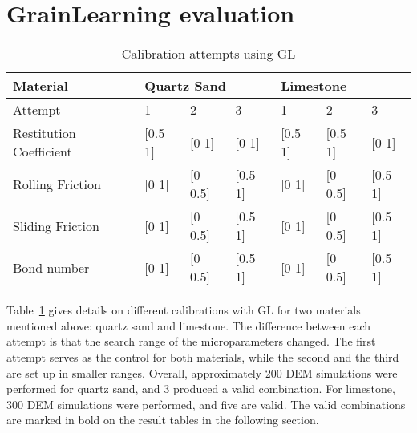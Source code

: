 \section{GrainLearning evaluation}\label{section:GLPerformance} 
\begin{table}[H]
    \centering
    \begin{tabular}{l|lll|lll}
    Material                & \multicolumn{3}{l|}{Quartz Sand}       & \multicolumn{3}{l}{Limestone}          \\ \hline
    Attempt                 & 1          & 2           & 3           & 1          & 2           & 3           \\ \hline
    Restitution Coefficient & {[}0.5  1{]} & {[}0  1{]}  & {[}0 1{]}   & {[}0.5  1{]} & {[}0.5  1{]}  & {[}0 1{]}   \\
    Rolling Friction        & {[}0 1{]}  & {[}0 0.5{]} & {[}0.5 1{]} & {[}0 1{]}  & {[}0 0.5{]} & {[}0.5 1{]} \\
    Sliding Friction        & {[}0 1{]}  & {[}0 0.5{]} & {[}0.5 1{]} & {[}0 1{]}  & {[}0 0.5{]} & {[}0.5 1{]} \\
    Bond number             & {[}0 1{]}  & {[}0 0.5{]} & {[}0.5 1{]} & {[}0 1{]}  & {[}0 0.5{]} & {[}0.5 1{]} \\
    \end{tabular}
    \caption{Calibration attempts using GL}\label{table:GLCalibration}
\end{table}

Table~\ref{table:GLCalibration} gives details on different calibrations with GL for two materials mentioned above: quartz sand and limestone. The difference between each attempt is that the search range of the microparameters changed. The first attempt serves as the control for both materials, while the second and the third are set up in smaller ranges. Overall, approximately 200 DEM simulations were performed for quartz sand, and 3 produced a valid combination. For limestone, 300 DEM simulations were performed, and five are valid. The valid combinations are marked in bold on the result tables in the following section.

